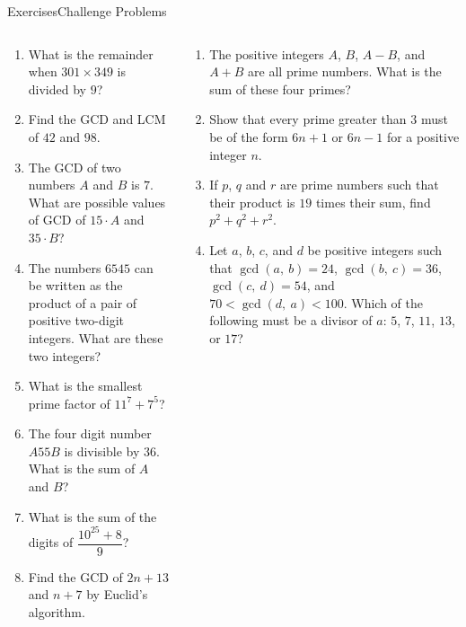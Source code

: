 \documentclass[9pt,aspectratio=169]{beamer}
\begin{document}
\begin{frame}{Exercises\hspace*{0.35\textwidth}Challenge Problems}
  \begin{columns}[T]
    \begin{column}{0.5\textwidth}
      \begin{enumerate}
        \item What is the remainder when $301 \times 349$ is divided by $9$?
        \item Find the GCD and LCM of $42$ and $98$.
        \item The GCD of two numbers $A$ and $B$ is $7$. What are possible values of GCD of $15 \cdot A$ and $35 \cdot B$?
        \item The numbers $6545$ can be written as the product of a pair of positive two-digit integers. What are these two integers?
        \item What is the smallest prime factor of $11^7 + 7^5$?
        \item The four digit number $A55B$ is divisible by $36$. What is the sum of $A$ and $B$?
        \item What is the sum of the digits of $\dfrac{10^{25}+8}{9}$?
        \item Find the GCD of $2n+13$ and $n+7$ by Euclid's algorithm.
      \end{enumerate}
    \end{column}
    \begin{column}{0.5\textwidth}
      \begin{enumerate}
        \item The positive integers $A$, $B$, $A-B$, and $A+B$ are all prime numbers. What is the sum of these four primes?
        \item Show that every prime greater than $3$ must be of the form $6n+1$ or $6n-1$ for a positive integer $n$.
        \item If $p$, $q$ and $r$ are prime numbers such that their product is $19$ times their sum, find $p^2 + q^2 + r^2$.
        \item Let $a$, $b$, $c$, and $d$ be positive integers such that $\gcd(a,\ b)=24$, $\gcd(b,\ c)=36$, $\gcd(c,\ d)=54$, and $70<\gcd(d,\ a)<100$. Which of the following must be a divisor of $a$: $5$, $7$, $11$, $13$, or $17$? 
      \end{enumerate}
    \end{column}
  \end{columns}
\end{frame}
\end{document}
